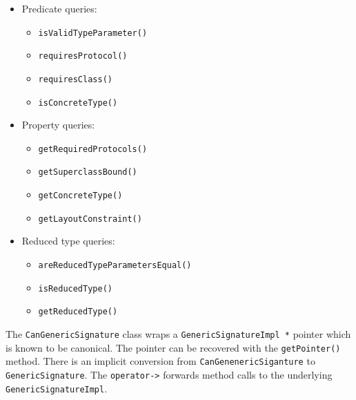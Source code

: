 \documentclass[../generics]{subfiles}
\begin{document}
\begin{itemize}
\item Predicate queries:
\begin{itemize}
\item \texttt{isValidTypeParameter()}
\item \texttt{requiresProtocol()}
\item \texttt{requiresClass()}
\item \texttt{isConcreteType()}
\end{itemize}
\item Property queries:
\begin{itemize}
\item \texttt{getRequiredProtocols()}
\item \texttt{getSuperclassBound()}
\item \texttt{getConcreteType()}
\item \texttt{getLayoutConstraint()}
\end{itemize}
\item Reduced type queries:
\begin{itemize}
\item \texttt{areReducedTypeParametersEqual()}
\item \texttt{isReducedType()}
\item \texttt{getReducedType()}
\end{itemize}
\end{itemize}

The \texttt{CanGenericSignature} class wraps a \texttt{GenericSignatureImpl *} pointer which is known to be canonical. The pointer can be recovered with the \texttt{getPointer()} method. There is an implicit conversion from \texttt{CanGenenericSiganture} to \texttt{GenericSignature}. The \texttt{operator->} forwards method calls to the underlying \texttt{GenericSignatureImpl}.
\end{document}

